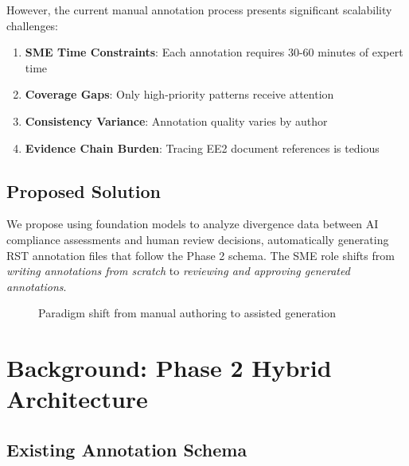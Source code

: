 \documentclass[11pt,a4paper]{article}
\begin{document}
However, the current manual annotation process presents significant scalability challenges:

\begin{enumerate}
    \item \textbf{SME Time Constraints}: Each annotation requires 30-60 minutes of expert time
    \item \textbf{Coverage Gaps}: Only high-priority patterns receive attention
    \item \textbf{Consistency Variance}: Annotation quality varies by author
    \item \textbf{Evidence Chain Burden}: Tracing EE2 document references is tedious
\end{enumerate}

\subsection{Proposed Solution}

We propose using foundation models to analyze divergence data between AI compliance assessments and human review decisions, automatically generating RST annotation files that follow the Phase 2 schema. The SME role shifts from \textit{writing annotations from scratch} to \textit{reviewing and approving generated annotations}.

\begin{figure}[H]
\centering
{}
\caption{Paradigm shift from manual authoring to assisted generation}
\end{figure}

\section{Background: Phase 2 Hybrid Architecture}

\subsection{Existing Annotation Schema}
\end{document}
